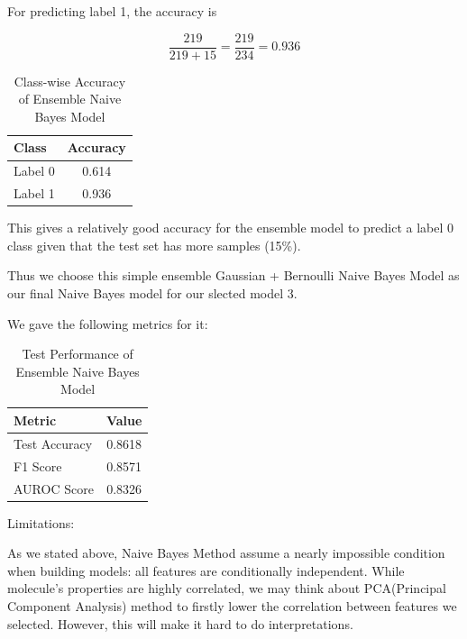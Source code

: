 \documentclass{article}
\begin{document}
For predicting label 1, the accuracy is

\[
\frac{219}{219+15}=\frac{219}{234}=0.936
\]

\begin{table}[h]
\centering
\caption{Class-wise Accuracy of Ensemble Naive Bayes Model}
\begin{tabular}{lc}
\hline
Class & Accuracy \\
\hline
Label 0 & 0.614 \\
Label 1 & 0.936 \\
\hline
\end{tabular}
\end{table}

\newpage

This gives a relatively good accuracy for the ensemble model to predict a
label 0 class given that the test set has more samples (15\%).

Thus we choose this simple ensemble Gaussian + Bernoulli Naive Bayes Model
as our final Naive Bayes model for our slected model 3.

We gave the following metrics for it:

\begin{table}[h]
\centering
\caption{Test Performance of Ensemble Naive Bayes Model}
\begin{tabular}{lc}
\hline
Metric & Value \\
\hline
Test Accuracy & 0.8618 \\
F1 Score & 0.8571 \\
AUROC Score & 0.8326 \\
\hline
\end{tabular}
\end{table}

Limitations:

As we stated above, Naive Bayes Method assume a nearly impossible
condition when building models: all features are conditionally
independent. While molecule's properties are highly correlated,
we may think about PCA(Principal Component Analysis) method to firstly lower the correlation between features we selected.
However, this will make it hard to do interpretations.
\end{document}
